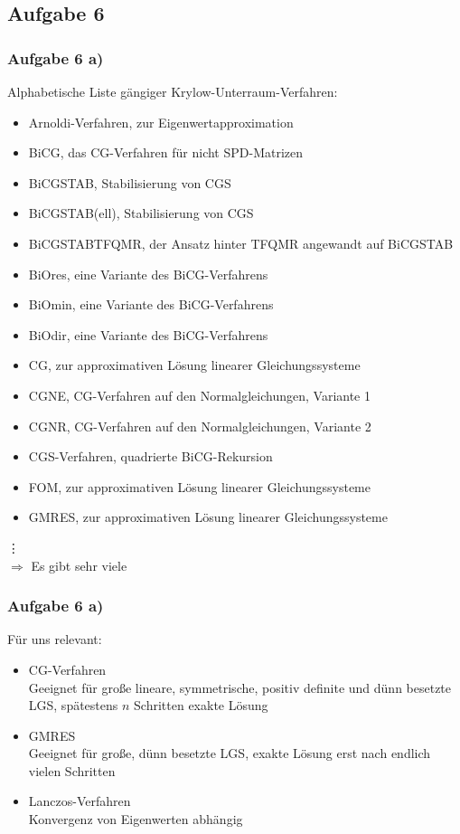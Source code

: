 \documentclass[german,notes,18pt]{beamer}
\begin{document}
	\subsection{Aufgabe 6}
	\begin{frame}
		\frametitle{Aufgabe 6 a)}
		
		Alphabetische Liste gängiger Krylow-Unterraum-Verfahren:
		\begin{itemize}
			\item Arnoldi-Verfahren, zur Eigenwertapproximation
			\item BiCG, das CG-Verfahren für nicht SPD-Matrizen
			\item BiCGSTAB, Stabilisierung von CGS
			\item BiCGSTAB(ell), Stabilisierung von CGS
			\small
			\item BiCGSTABTFQMR, der Ansatz hinter TFQMR angewandt auf BiCGSTAB
			\footnotesize
			\item BiOres, eine Variante des BiCG-Verfahrens
			\scriptsize
			\item BiOmin, eine Variante des BiCG-Verfahrens
			\tiny
			\item BiOdir, eine Variante des BiCG-Verfahrens
			\Tiny
			\item CG, zur approximativen Lösung linearer Gleichungssysteme
			\fontsize{4pt}{0pt}\selectfont
			\item CGNE, CG-Verfahren auf den Normalgleichungen, Variante 1
			\fontsize{3pt}{0pt}\selectfont
			\item CGNR, CG-Verfahren auf den Normalgleichungen, Variante 2
			\fontsize{2pt}{0pt}\selectfont
			\item CGS-Verfahren, quadrierte BiCG-Rekursion
			\fontsize{1pt}{0pt}\selectfont
			\item FOM, zur approximativen Lösung linearer Gleichungssysteme
			\item GMRES, zur approximativen Lösung linearer Gleichungssysteme
		\end{itemize}
		\vspace{-0.5em}\hspace{3em}\vdots \\
		$\Rightarrow$ Es gibt sehr viele
	\end{frame}

	\begin{frame}
		\frametitle{Aufgabe 6 a)}
		Für uns relevant:
		\begin{itemize}
			\item CG-Verfahren \\
			Geeignet für große lineare, symmetrische, positiv definite und dünn besetzte LGS, spätestens $n$ Schritten  exakte Lösung
			
			\item GMRES \\
			Geeignet für große, dünn besetzte LGS, exakte Lösung erst nach endlich vielen Schritten
			
			\item Lanczos-Verfahren \\
			Konvergenz von Eigenwerten abhängig
		\end{itemize}
	\end{frame}
\end{document}
